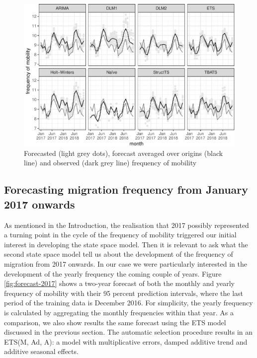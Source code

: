 \documentclass[]{article}
\begin{document}
\begin{figure}
\centering
\includegraphics{../figs/freq--forecast-2017-2018-1.pdf}
\caption{\label{fig:forecast-2017-2018}Forecasted (light grey dots),
forecast averaged over origins (black line) and observed (dark grey
line) frequency of mobility}
\end{figure}

\subsection{Forecasting migration frequency from January 2017
onwards}\label{forecasting-migration-frequency-from-january-2017-onwards}

As mentioned in the Introduction, the realisation that 2017 possibly
represented a turning point in the cycle of the frequency of mobility
triggered our initial interest in developing the state space model. Then
it is relevant to ask what the second state space model tell us about
the development of the frequency of migration from 2017 onwards. In our
case we were particularly interested in the development of the yearly
frequency the coming couple of years. Figure \ref{fig:forecast-2017}
shows a two-year forecast of both the monthly and yearly frequency of
mobility with their 95 percent prediction intervals, where the last
period of the training data is December 2016. For simplicity, the yearly
frequency is calculated by aggregating the monthly frequencies within
that year. As a comparison, we also show results the same forecast using
the ETS model discussed in the previous section. The automatic selection
procedure results in an ETS(M, Ad, A): a model with multiplicative
errors, damped additive trend and additive seasonal effects.
\end{document}

